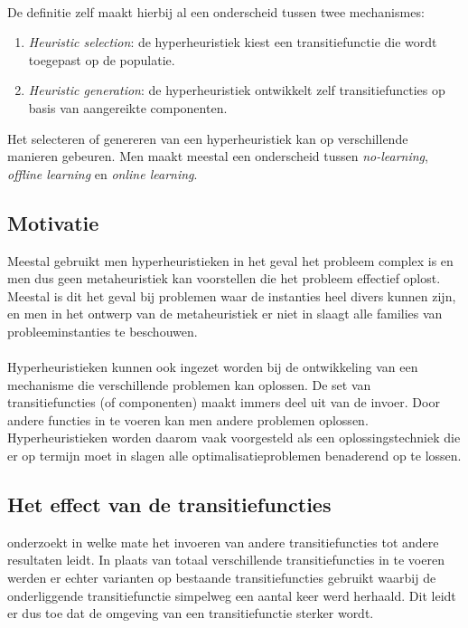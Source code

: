 \paragraph{}
De definitie zelf maakt hierbij al een onderscheid tussen twee mechanismes\cite{Burke_aclassification}:
\begin{enumerate}
 \item \emph{Heuristic selection}: de hyperheuristiek kiest een transitiefunctie die wordt toegepast op de populatie.
 \item \emph{Heuristic generation}: de hyperheuristiek ontwikkelt zelf transitiefuncties op basis van aangereikte componenten.
\end{enumerate}

Het selecteren of genereren van een hyperheuristiek kan op verschillende manieren gebeuren. Men maakt meestal een onderscheid tussen \emph{no-learning}, \emph{offline learning} en \emph{online learning}.

\subsection{Motivatie}
Meestal gebruikt men hyperheuristieken in het geval het probleem complex is en men dus geen metaheuristiek kan voorstellen die het probleem effectief oplost. Meestal is dit het geval bij problemen waar de instanties heel divers kunnen zijn, en men in het ontwerp van de metaheuristiek er niet in slaagt alle families van probleeminstanties te beschouwen.
\paragraph{}
Hyperheuristieken kunnen ook ingezet worden bij de ontwikkeling van een mechanisme die verschillende problemen kan oplossen. De set van transitiefuncties (of componenten) maakt immers deel uit van de invoer. Door andere functies in te voeren kan men andere problemen oplossen. Hyperheuristieken worden daarom vaak voorgesteld als een oplossingstechniek die er op termijn moet in slagen alle optimalisatieproblemen benaderend op te lossen.

\subsection{Het effect van de transitiefuncties}
\cite{misirEffect} onderzoekt in welke mate het invoeren van andere transitiefuncties tot andere resultaten leidt. In plaats van totaal verschillende transitiefuncties in te voeren werden er echter varianten op bestaande transitiefuncties gebruikt waarbij de onderliggende transitiefunctie simpelweg een aantal keer werd herhaald. Dit leidt er dus toe dat de omgeving van een transitiefunctie sterker wordt.
